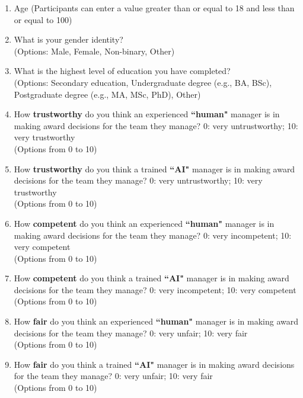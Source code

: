 \begin{enumerate}
    \item Age (Participants can enter a value greater than or equal to 18 and less than or equal to 100)
    \item What is your gender identity?
    \\ (Options: Male, Female, Non-binary, Other)

    \item What is the highest level of education you have completed?
    \\ (Options: Secondary education, Undergraduate degree (e.g., BA, BSc), Postgraduate degree (e.g., MA, MSc, PhD), Other)

    \item How \textbf{trustworthy} do you think an experienced \textbf{``human"} manager is in making award decisions for the team they manage? 0: very untrustworthy; 10: very trustworthy
    \\ (Options from 0 to 10)
    
    \item How \textbf{trustworthy} do you think a trained \textbf{``AI"} manager is in making award decisions for the team they manage? 0: very untrustworthy; 10: very trustworthy
   \\ (Options from 0 to 10)
   
    \item How \textbf{competent} do you think an experienced \textbf{``human"} manager is in making award decisions for the team they manage? 0: very incompetent; 10: very competent
    \\ (Options from 0 to 10)

    \item How \textbf{competent} do you think a trained \textbf{``AI"} manager is in making award decisions for the team they manage? 0: very incompetent; 10: very competent
   \\ (Options from 0 to 10)
    
    \item How \textbf{fair} do you think an experienced \textbf{``human"} manager is in making award decisions for the team they manage? 0: very unfair; 10: very fair
   \\ (Options from 0 to 10)

    \item How \textbf{fair} do you think a trained \textbf{``AI"} manager is in making award decisions for the team they manage? 0: very unfair; 10: very fair
   \\ (Options from 0 to 10)
  

\end{enumerate}
